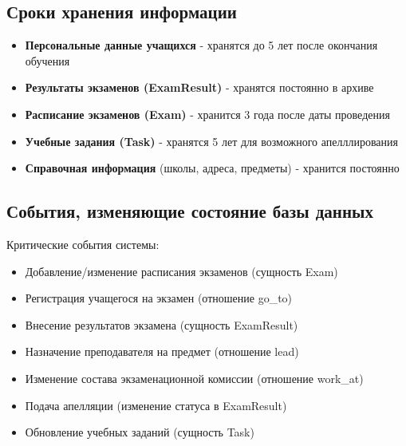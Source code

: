 \documentclass[a4paper]{article}
\begin{document}
\subsection{Сроки хранения информации}
\begin{itemize}
      \item \textbf{Персональные данные учащихся} - хранятся до 5 лет после окончания обучения
      \item \textbf{Результаты экзаменов (ExamResult)} - хранятся постоянно в архиве
      \item \textbf{Расписание экзаменов (Exam)} - хранится 3 года после даты проведения
      \item \textbf{Учебные задания (Task)} - хранятся 5 лет для возможного апелллирования
      \item \textbf{Справочная информация} (школы, адреса, предметы) - хранится постоянно
\end{itemize}

\subsection{События, изменяющие состояние базы данных}
Критические события системы:
\begin{itemize}
      \item Добавление/изменение расписания экзаменов (сущность Exam)
      \item Регистрация учащегося на экзамен (отношение go\_to)
      \item Внесение результатов экзамена (сущность ExamResult)
      \item Назначение преподавателя на предмет (отношение lead)
      \item Изменение состава экзаменационной комиссии (отношение work\_at)
      \item Подача апелляции (изменение статуса в ExamResult)
      \item Обновление учебных заданий (сущность Task)
\end{itemize}
\end{document}
